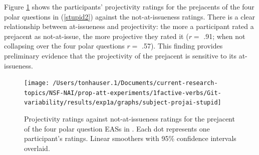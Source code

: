 \documentclass[11pt,fleqn]{article}
\newcommand{\6}{\mbox{$[\hspace*{-.6mm}[$}}
\newcommand{\9}{\mbox{$]\hspace*{-.6mm}]$}}
\begin{document}
Figure \ref{f-corr} shows the participants' projectivity ratings for the prejacents of the four polar questions in (\ref{stupid2}) against the not-at-issueness ratings. There is a clear relationship between at-issueness and projectivity: the more a participant rated a prejacent as not-at-issue, the more projective they rated it ($r =$ .91; when not collapsing over the four polar questions $r =$ .57). This finding provides preliminary evidence that the projectivity of the prejacent is sensitive to its at-issueness.

\begin{figure}[h!]
\centering

\texttt{[image: /Users/tonhauser.1/Documents/current-research-topics/NSF-NAI/prop-att-experiments/1factive-verbs/Git-variability/results/exp1a/graphs/subject-projai-stupid]}

\caption{Projectivity ratings against not-at-issueness ratings for the prejacent of the four polar question EASs in \citealt{tbd-variability}. Each dot represents one participant's ratings. Linear smoothers with 95\% confidence intervals overlaid.}
\label{f-corr}
\end{figure}
\end{document}
